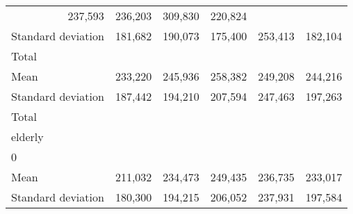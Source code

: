 \begin{tabular}{llllll}
  \multicolumn{1}{r}{237,593} &
  \multicolumn{1}{r}{236,203} &
  \multicolumn{1}{r}{309,830} &
  \multicolumn{1}{r}{220,824} \\
\multicolumn{1}{l}{\hspace{4em}Standard deviation} &
  \multicolumn{1}{|r}{181,682} &
  \multicolumn{1}{r}{190,073} &
  \multicolumn{1}{r}{175,400} &
  \multicolumn{1}{r}{253,413} &
  \multicolumn{1}{r}{182,104} \\
\multicolumn{1}{l}{\hspace{3em}Total} &
  \multicolumn{1}{|r}{} &
  \multicolumn{1}{r}{} &
  \multicolumn{1}{r}{} &
  \multicolumn{1}{r}{} &
  \multicolumn{1}{r}{} \\
\multicolumn{1}{l}{\hspace{4em}Mean} &
  \multicolumn{1}{|r}{233,220} &
  \multicolumn{1}{r}{245,936} &
  \multicolumn{1}{r}{258,382} &
  \multicolumn{1}{r}{249,208} &
  \multicolumn{1}{r}{244,216} \\
\multicolumn{1}{l}{\hspace{4em}Standard deviation} &
  \multicolumn{1}{|r}{187,442} &
  \multicolumn{1}{r}{194,210} &
  \multicolumn{1}{r}{207,594} &
  \multicolumn{1}{r}{247,463} &
  \multicolumn{1}{r}{197,263} \\
\multicolumn{1}{l}{\hspace{1em}Total} &
  \multicolumn{1}{|r}{} &
  \multicolumn{1}{r}{} &
  \multicolumn{1}{r}{} &
  \multicolumn{1}{r}{} &
  \multicolumn{1}{r}{} \\
\multicolumn{1}{l}{\hspace{2em}elderly} &
  \multicolumn{1}{|r}{} &
  \multicolumn{1}{r}{} &
  \multicolumn{1}{r}{} &
  \multicolumn{1}{r}{} &
  \multicolumn{1}{r}{} \\
\multicolumn{1}{l}{\hspace{3em}0} &
  \multicolumn{1}{|r}{} &
  \multicolumn{1}{r}{} &
  \multicolumn{1}{r}{} &
  \multicolumn{1}{r}{} &
  \multicolumn{1}{r}{} \\
\multicolumn{1}{l}{\hspace{4em}Mean} &
  \multicolumn{1}{|r}{211,032} &
  \multicolumn{1}{r}{234,473} &
  \multicolumn{1}{r}{249,435} &
  \multicolumn{1}{r}{236,735} &
  \multicolumn{1}{r}{233,017} \\
\multicolumn{1}{l}{\hspace{4em}Standard deviation} &
  \multicolumn{1}{|r}{180,300} &
  \multicolumn{1}{r}{194,215} &
  \multicolumn{1}{r}{206,052} &
  \multicolumn{1}{r}{237,931} &
  \multicolumn{1}{r}{197,584} \\

\end{tabular}
